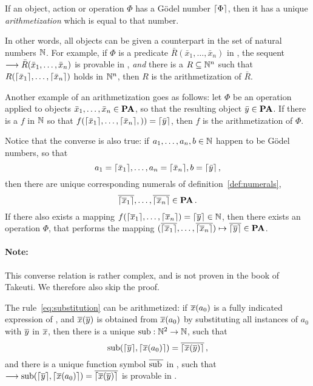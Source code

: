 \documentclass[11pt,a4paper]{article}
\begin{document}
\begin{definition}[Arithmetization]\label{def:arithmetization}
    If an object, action or operation \(\Phi\) has a Gödel number \(\lceil\Phi\rceil\),
    then it has a unique \emph{arithmetization} which is equal to that number.
\end{definition}

In other words, all objects can be given a counterpart in the set
of natural numbers \(\mathbb{N}\). For example, if \(\Phi\) is a predicate
\(\bar R(\bar x_1,\ldots,\bar x_n)\) in \PA{},
the sequent \(\longrightarrow\bar R(\bar x_1,\ldots,\bar x_n)\) is provable in \PA{},
\emph{and} there is a \PRR{} \(R\subseteq \mathbb{N}^n\)
such that \(R(\lceil\bar x_1\rceil,\ldots,\lceil\bar x_n\rceil)\)
holds in \(\mathbb{N}^n\), then \(R\) is the arithmetization of \(\bar R\).

Another example of an arithmetization goes as follows:
let \(\Phi\) be an operation applied to objects
\(\bar x_1,\ldots,\bar x_n \in\textbf{PA}\),
so that the resulting object \(\bar y\in\textbf{PA}{}\).
If there is a \PRF{} \(f\) in \(\mathbb{N}\) so that
\(f(\lceil\bar x_1\rceil,\ldots,\lceil\bar x_n\rceil,)) = \lceil\bar y\rceil\),
then \(f\) is the arithmetization of \(\Phi\).

Notice that the converse is also true:
if \(a_1,\ldots,a_n,b\in\mathbb{N}\) happen to be
Gödel numbers, so that
\begin{equation*}
    a_1 = \lceil\bar x_1\rceil,\ldots, a_n = \lceil\bar x_n\rceil, b = \lceil\bar y\rceil\,,
\end{equation*}
then there are unique corresponding numerals of definition~\ref{def:numerals},
\begin{equation*}
    \overline{\lceil\overline{x}_1\rceil},\ldots,\overline{\lceil\overline{x}_n\rceil} \in\textbf{PA}\,.
\end{equation*}
If there also exists a mapping
\(f(\lceil\overline{x}_1\rceil,\ldots,\lceil\overline{x}_n\rceil) = \lceil\overline{y}\rceil \in\mathbb{N}\),
then there exists an operation \(\Phi\), that performs the mapping
\((\overline{\lceil\overline{x}_1\rceil},\ldots,\overline{\lceil\overline{x}_n\rceil})\mapsto\overline{\lceil\overline{y}\rceil}\in\textbf{PA}{}\).

\paragraph{Note:}
This converse relation is rather complex, and is not proven
in the book of Takeuti. We therefore also skip the proof. {\Large\trollface}

\begin{lemma}[10.8.1]\label{lem:10.8.1}
    The rule~\eqref{eq:substitution} can be arithmetized:
    if \(\overline{x}(a_0)\) is a fully indicated expression of \PA,
    and \(\overline{x}(\overline{y})\) is obtained from \(\overline{x}(a_0)\)
    by substituting all instances of \(a_0\) with \(\overline{y}\)
    in \(\overline{x}\), then there is a unique \PRF{} \(\operatorname{sub}: \mathbb{N}^2\to\mathbb{N}\),
    such that
    \begin{equation*}
        \sub\arcs*{\G{\num y}, \G{\num x(a_0)}} = \num{\G{\num x(\num y)}}\,,
    \end{equation*}
    and there is a unique function symbol \(\overline{\operatorname{sub}{}}\) in \PA{},
    such that \(\seq\sub\arcs*{\G{\num y}, \G{\num x(a_0)}} = \num{\G{\num x(\num y)}}\)
    is provable in \PA{}.
\end{lemma}
\end{document}
